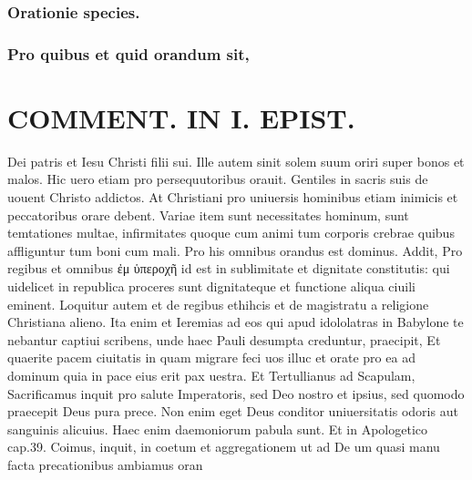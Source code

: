 \documentclass{article}
\begin{document}
\begin{pages}
\subsubsection*{Orationie species. }
\subsubsection*{Pro quibus et quid orandum sit, }
\section*{COMMENT. IN I. EPIST. }\pstart Dei patris et Iesu Christi filii sui. Ille autem sinit solem suum oriri super bonos et malos. Hic uero etiam pro persequutoribus orauit. Gentiles in sacris suis de uouent Christo addictos. At Christiani pro uniuersis hominibus etiam inimicis et peccatoribus orare debent. Variae item sunt necessitates hominum, sunt temtationes multae, infirmitates quoque cum animi tum corporis crebrae quibus affliguntur tum boni cum mali. Pro his omnibus orandus est dominus. Addit, Pro regibus et omnibus ἐμ ὑπεροχῆ id est in sublimitate et dignitate constitutis: qui uidelicet in republica proceres sunt dignitateque et functione aliqua ciuili eminent. Loquitur autem et de regibus ethihcis et de magistratu a religione Christiana alieno. Ita enim et Ieremias ad eos qui apud idololatras in Babylone te nebantur captiui scribens, unde haec Pauli desumpta creduntur, praecipit, Et quaerite pacem ciuitatis in quam migrare feci uos illuc et orate pro ea ad dominum quia in pace eius erit pax uestra. Et Tertullianus ad Scapulam, Sacrificamus inquit pro salute Imperatoris, sed Deo nostro et ipsius, sed quomodo praecepit Deus pura prece. Non enim eget Deus conditor uniuersitatis odoris aut sanguinis alicuius. Haec enim daemoniorum pabula sunt. Et in Apologetico cap.39. Coimus, inquit, in coetum et aggregationem ut ad De um quasi manu facta precationibus ambiamus oran\pend

\end{pages}
\end{document}
